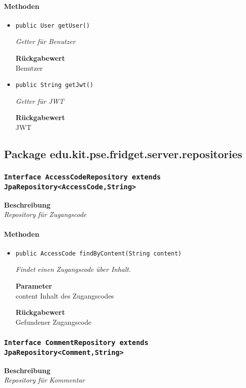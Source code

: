      \paragraph*{Methoden}
     \begin{itemize}
     	\item{\texttt{public User getUser()}}
     	
     	\textit{Getter für Benutzer}
     	
     	
     	
     	\textbf{Rückgabewert} \\
     	Benutzer        \item{\texttt{public String getJwt()}}
     	
     	\textit{Getter für JWT}
     	
     	
     	
     	\textbf{Rückgabewert} \\
     	JWT
     \end{itemize}
     \subsection{Package edu.kit.pse.fridget.server.repositories}
     \subsubsection{\texttt{Interface AccessCodeRepository extends JpaRepository<AccessCode,String>}}
     \textbf{Beschreibung} \\
     \textit{Repository für Zugangscode}
     \paragraph*{Methoden}
     \begin{itemize}
     	\item{\texttt{public AccessCode findByContent(String content)}}
     	
     	\textit{Findet einen Zugangscode über Inhalt.}
     	
     	\textbf{Parameter} \\
     	content Inhalt des Zugangscodes
     	
     	\textbf{Rückgabewert} \\
     	Gefundener Zugangscode
     \end{itemize}
     \subsubsection{\texttt{Interface CommentRepository extends JpaRepository<Comment,String>}}
     \textbf{Beschreibung} \\
     \textit{Repository für Kommentar}
